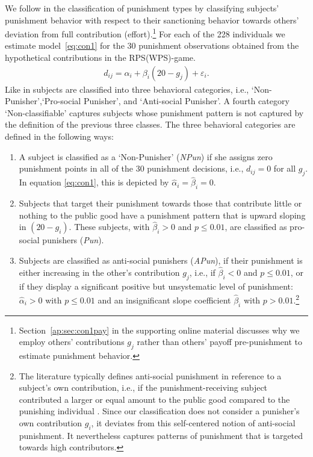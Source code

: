 \documentclass[11pt,a4paper]{article}
\begin{document}
\begin{refsection}
We follow \cite{Albrecht2016a} in the classification of punishment types by
classifying subjects' punishment behavior with respect to their sanctioning
behavior towards others' deviation from full contribution
(effort).\footnote{Section~\ref{ap:sec:con1pay} in the supporting online
  material discusses why we employ others' contributions $g_j$ rather than
  others' payoff pre-punishment to estimate punishment behavior.}
For each of the 228 individuals we estimate model~\ref{eq:con1} for the $30$
punishment observations obtained from the hypothetical contributions in the RPS(WPS)-game.
%
\begin{align}
d_{ij} = \alpha_i + \beta_i (20 - g_j) + \varepsilon_i \text{.}
    \label{eq:con1}
\end{align}
%
Like in \cite{Albrecht2016a} subjects are classified into three behavioral
categories, i.e., `Non-Punisher',`Pro-social Punisher', and `Anti-social
Punisher'. A fourth category `Non-clas\-si\-fi\-able' captures subjects whose
punishment pattern is not captured by the definition of the previous three
classes.
The three behavioral categories are defined in the following ways:
\begin{enumerate}
\item A subject is classified as a `Non-Punisher' (\emph{NPun}) if she assigns
  zero punishment points in all of the 30 punishment decisions, i.e., $d_{ij} =
  0$ for all $g_j$. In equation \eqref{eq:con1}, this is depicted by
  $\hat{\alpha}_i=\hat{\beta}_i=0$.
\item Subjects that target their punishment towards those that contribute little
  or nothing to the public good have a punishment pattern that is upward sloping
  in $(20 - g_i)$. These subjects, with $\hat{\beta}_i>0$ and $p \leq 0.01$, are
  classified as pro-social punishers (\emph{Pun}). 
\item Subjects are classified as anti-social punishers (\emph{APun}), if their
  punishment is either increasing in the other's contribution $g_j$, i.e., if
  $\hat{\beta}_i < 0$ and $p \leq 0.01$, or if they display a significant
  positive but unsystematic level of punishment: $\hat{\alpha}_i>0$ with $p \leq
  0.01$ and an insignificant slope coefficient $\hat{\beta}_i$ with $p >
  0.01$.\footnote{The literature typically defines anti-social punishment in
    reference to a subject's own contribution, i.e., if the punishment-receiving
    subject contributed a larger or equal amount to the public good compared to
    the punishing individual \citep[e.g.,][]{Herrmann2008}. Since our
    classification does not consider a punisher's own contribution $g_i$, it
    deviates from this self-centered notion of anti-social punishment. It
    nevertheless captures patterns of punishment that is targeted towards high
    contributors.}
\end{enumerate}


\end{refsection}
\end{document}
